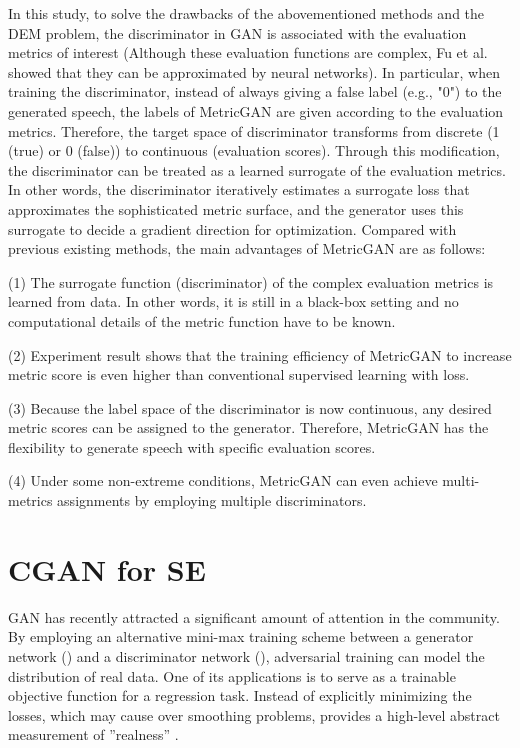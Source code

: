 \documentclass{article}
\begin{document}
 In this study, to solve the drawbacks of the abovementioned methods and the DEM problem, the discriminator in GAN is associated with the evaluation metrics of interest (Although these evaluation functions are complex, Fu et al.  showed that they can be approximated by neural networks). In particular, when training the discriminator, instead of always giving a false label (e.g., "0") to the generated speech, the labels of  MetricGAN are given according to the evaluation metrics. Therefore, the target space of discriminator transforms from discrete (1 (true) or 0 (false)) to continuous (evaluation scores). Through this modification, the discriminator can be treated as a learned surrogate of the evaluation metrics. In other words, the discriminator iteratively estimates a surrogate loss that approximates the sophisticated metric surface, and the generator uses this surrogate to decide a gradient
direction for optimization. Compared with previous existing methods, the main advantages of MetricGAN are as follows:
 
(1) The surrogate function (discriminator) of the complex evaluation metrics is learned from data. In other words, it is still in a black-box setting and no computational details of the metric function have to be known.

(2) Experiment result shows that the training efficiency of MetricGAN to increase metric score is even higher than conventional supervised learning with  loss.

(3) Because the label space of the discriminator is now continuous, any desired metric scores can be assigned to the generator. Therefore, MetricGAN has the flexibility to generate speech with specific evaluation scores. 

(4) Under some non-extreme conditions, MetricGAN can even achieve multi-metrics assignments by employing multiple discriminators.




\section{CGAN for SE}
GAN has recently attracted a significant amount of attention in the community. By employing an alternative mini-max training scheme between a generator network () and a discriminator network (), adversarial training can model the distribution of real data. One of its applications is to serve as a trainable objective function for a regression task. Instead of explicitly minimizing the  losses, which may cause over smoothing problems,  provides a high-level abstract measurement of ”realness” \cite{liao2018noise}. 
\end{document}
